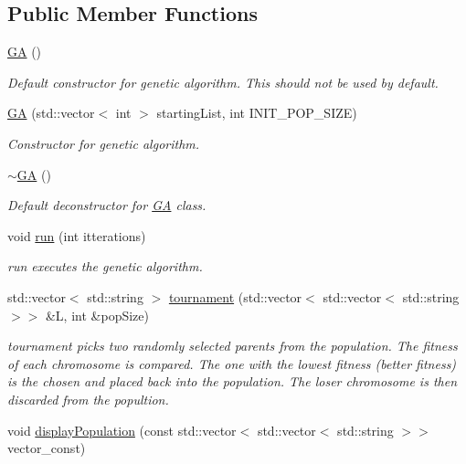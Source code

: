\subsection*{Public Member Functions}
\begin{DoxyCompactItemize}
\item 
\hyperlink{class_g_a_a754149f21a0440f8078abb48f1c88ef3}{GA} ()
\begin{DoxyCompactList}\small\item\em Default constructor for genetic algorithm. This should not be used by default. \end{DoxyCompactList}\item 
\hyperlink{class_g_a_a523a5fa03652f94984ba5454632ec385}{GA} (std\+::vector$<$ int $>$ starting\+List, int I\+N\+I\+T\+\_\+\+P\+O\+P\+\_\+\+S\+I\+ZE)
\begin{DoxyCompactList}\small\item\em Constructor for genetic algorithm. \end{DoxyCompactList}\item 
\hyperlink{class_g_a_a18975e5b8b24b68b2d783ae3080845c9}{$\sim$\+GA} ()
\begin{DoxyCompactList}\small\item\em Default deconstructor for \hyperlink{class_g_a}{GA} class. \end{DoxyCompactList}\item 
void \hyperlink{class_g_a_a4828dadbded41199cb54fc71daf4bd44}{run} (int itterations)
\begin{DoxyCompactList}\small\item\em run executes the genetic algorithm. \end{DoxyCompactList}\item 
std\+::vector$<$ std\+::string $>$ \hyperlink{class_g_a_a6bd43faf13978fc5ea9ed305523288d6}{tournament} (std\+::vector$<$ std\+::vector$<$ std\+::string $>$$>$ \&L, int \&pop\+Size)
\begin{DoxyCompactList}\small\item\em tournament picks two randomly selected parents from the population. The fitness of each chromosome is compared. The one with the lowest fitness (better fitness) is the chosen and placed back into the population. The loser chromosome is then discarded from the popultion. \end{DoxyCompactList}\item 
void \hyperlink{class_g_a_a3dd11c58a07b6d73b7eeaed2821ac762}{display\+Population} (const std\+::vector$<$ std\+::vector$<$ std\+::string $>$$>$ vector\+\_\+const)

\end{DoxyCompactItemize}
